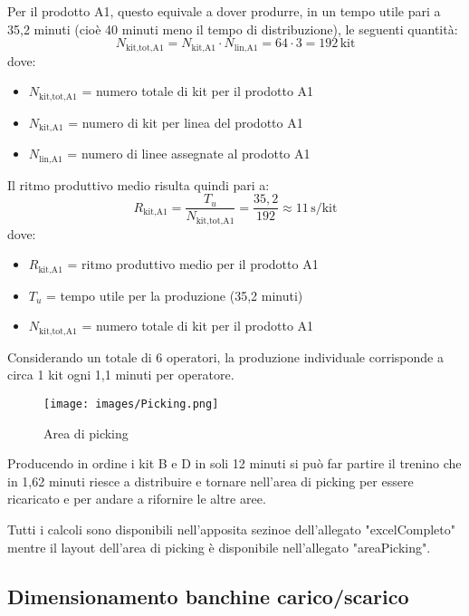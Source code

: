\documentclass[11pt]{article}
\begin{document}
Per il prodotto A1, questo equivale a dover produrre, in un tempo utile pari a 35,2 minuti (cioè 40 minuti meno il tempo di distribuzione), le seguenti quantità:
\begin{equation}
    N_\text{kit,tot,A1} = N_\text{kit,A1} \cdot N_\text{lin,A1} = 64 \cdot 3 = 192 \, \text{kit}
\end{equation}
dove:
\begin{itemize}
    \item $N_\text{kit,tot,A1}$ = numero totale di kit per il prodotto A1
    \item $N_\text{kit,A1}$ = numero di kit per linea del prodotto A1
    \item $N_\text{lin,A1}$ = numero di linee assegnate al prodotto A1
\end{itemize}

\noindent
Il ritmo produttivo medio risulta quindi pari a:
\begin{equation}
    R_\text{kit,A1} = \frac{T_u}{N_\text{kit,tot,A1}} = \frac{35{,}2}{192} \approx 11 \, \text{s/kit}
\end{equation}
dove:
\begin{itemize}
    \item $R_\text{kit,A1}$ = ritmo produttivo medio per il prodotto A1
    \item $T_u$ = tempo utile per la produzione (35,2 minuti)
    \item $N_\text{kit,tot,A1}$ = numero totale di kit per il prodotto A1
\end{itemize}

Considerando un totale di 6 operatori, la produzione individuale corrisponde a circa 1 kit ogni 1,1 minuti per operatore.

\begin{figure}[H]
    \centering
    \texttt{[image: images/Picking.png]}
    \caption{Area di picking}
    \label{fig: Area di picking}
\end{figure}

Producendo in ordine i kit B e D in soli 12 minuti si può far partire il trenino che in 1,62 minuti riesce a distribuire e tornare nell'area di picking per essere ricaricato e per andare a rifornire le altre aree.

Tutti i calcoli sono disponibili nell'apposita sezinoe dell'allegato "{{excelCompleto}}" mentre il layout dell'area di picking è disponibile nell'allegato "{{areaPicking}}".

\newpage

\subsection{Dimensionamento banchine carico/scarico}
\end{document}
